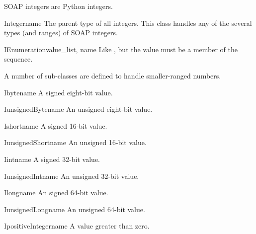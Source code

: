 SOAP integers are Python integers.

\begin{classdesc}{Integer}{name}
The parent type of all integers.
This class handles any of the several types (and ranges) of SOAP integers.
\end{classdesc}

\begin{classdesc}{IEnumeration}{value_list, name}
Like , but the value must be a member of
the  sequence.
\end{classdesc}

A number of sub-classes are defined to handle smaller-ranged numbers.

\begin{classdesc}{Ibyte}{name}
A signed eight-bit value.
\end{classdesc}

\begin{classdesc}{IunsignedByte}{name}
An unsigned eight-bit value.
\end{classdesc}

\begin{classdesc}{Ishort}{name}
A signed 16-bit value.
\end{classdesc}

\begin{classdesc}{IunsignedShort}{name}
An unsigned 16-bit value.
\end{classdesc}

\begin{classdesc}{Iint}{name}
A signed 32-bit value.
\end{classdesc}

\begin{classdesc}{IunsignedInt}{name}
An unsigned 32-bit value.
\end{classdesc}

\begin{classdesc}{Ilong}{name}
An signed 64-bit value.
\end{classdesc}

\begin{classdesc}{IunsignedLong}{name}
An unsigned 64-bit value.
\end{classdesc}

\begin{classdesc}{IpositiveInteger}{name}
A value greater than zero.
\end{classdesc}

